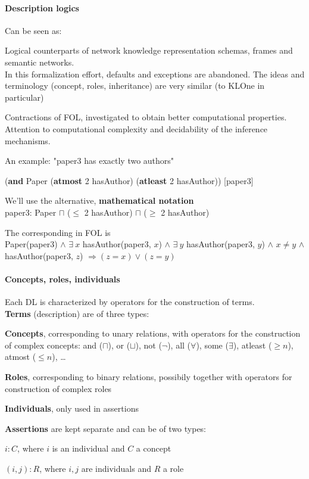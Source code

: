 \documentclass[10pt]{report}
\begin{document}
\paragraph{Description logics} Can be seen as:
\begin{list}{}{}
	\item Logical counterparts of network knowledge representation schemas, frames and semantic networks.\\
	In this formalization effort, defaults and exceptions are abandoned. The ideas and terminology (concept, roles, inheritance) are very similar (to KLOne in particular)
	\item Contractions of FOL, investigated to obtain better computational properties. Attention to computational complexity and decidability of the inference mechanisms.
\end{list}
An example: "paper3 has exactly two authors"
\begin{list}{}{}
	\item (\textbf{and} Paper (\textbf{atmost} 2 hasAuthor) (\textbf{atleast} 2 hasAuthor)) [paper3]
	\item We'll use the alternative, \textbf{mathematical notation}\\
	paper3: Paper $\sqcap$ ($\leq$ 2 hasAuthor) $\sqcap$ ($\geq$ 2 hasAuthor)
	\item The corresponding in FOL is\\
	Paper(paper3) $\wedge$ $\exists\:x$ hasAuthor(paper3, $x$) $\wedge$ $\exists\:y$ hasAuthor(paper3, $y$) $\wedge$ $x\neq y$ $\wedge$ hasAuthor(paper3, $z$) $\Rightarrow (z = x) \vee (z = y)$
\end{list}
\paragraph{Concepts, roles, individuals} Each DL is characterized by operators for the construction of terms.\\
\textbf{Terms} (description) are of three types:
\begin{list}{}{}
	\item \textbf{Concepts}, corresponding to unary relations, with operators for the construction of complex concepts: and ($\sqcap$), or ($\sqcup$), not ($\neg$), all ($\forall$), some ($\exists$), atleast ($\geq n$), atmost ($\leq n$), \ldots
	\item \textbf{Roles}, corresponding to binary relations, possibily together with operators for construction of complex roles
	\item \textbf{Individuals}, only used in assertions
\end{list}
\textbf{Assertions} are kept separate and can be of two types:
\begin{list}{}{}
	\item $i:C$, where $i$ is an individual and $C$ a concept
	\item $(i,j):R$, where $i,j$ are individuals and $R$ a role
\end{list}
\end{document}

